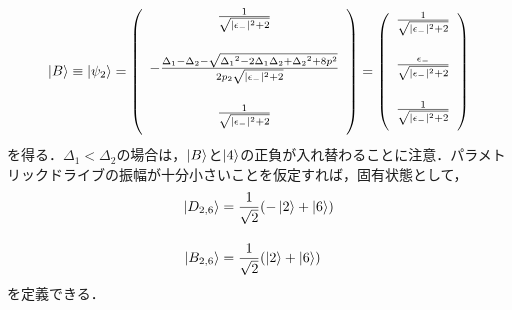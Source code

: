 \begin{equation}
     \ket{B}\equiv\ket{\psi_2}=\left(
        \begin{array}{c}
       \frac{1}{\sqrt{
       |\epsilon_{-}|^2
       +2}}\\[20pt]
       -\frac{{\Delta_1}-{\Delta_2}-\sqrt{{\Delta_1}^2-2{\Delta_1}{\Delta_2}+{\Delta_2}^2+8p^2}}{2{p_2}\sqrt{
       |\epsilon_{-}|^2
       +2}}\\[20pt]
       \frac{1}{\sqrt{
       |\epsilon_{-}|^2
       +2}}\\[10pt]
        \end{array}
        \right)
    =\left(
        \begin{array}{c}
       \frac{1}{\sqrt{
       |\epsilon_{-}|^2
       +2}}\\[20pt]
       \frac{
       \epsilon_-
       }{\sqrt{
       |\epsilon_{-}|^2
       +2}}\\[20pt]
       \frac{1}{\sqrt{
       |\epsilon_{-}|^2
       +2}}\\[10pt]
        \end{array}
        \right)
\end{equation}
を得る．$\Delta_1 < \Delta_2$の場合は，$\ket{B}$と$\ket{4}$の正負が入れ替わることに注意．パラメトリックドライブの振幅が十分小さいことを仮定すれば，固有状態として，
\begin{align}
    \ket{D_{2,6}} &= \frac{1}{\sqrt{2}}(-\ket{2}+\ket{6})\\[10pt]
    \ket{B_{2,6}} &= \frac{1}{\sqrt{2}}(\ket{2}+\ket{6})
\end{align}
を定義できる．



